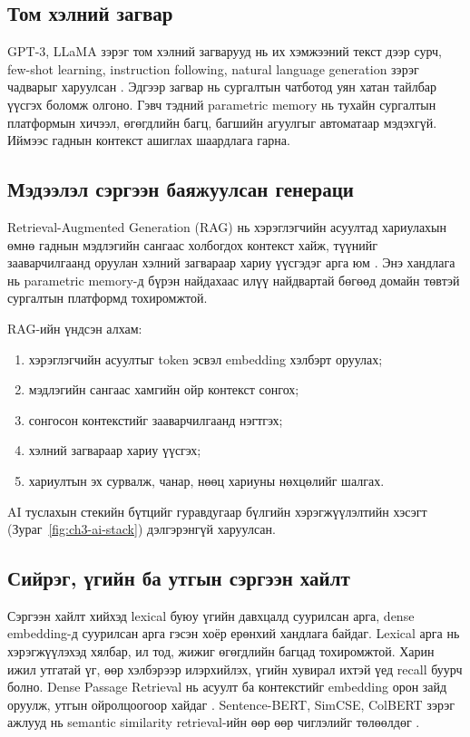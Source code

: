 \subsection{Том хэлний загвар}
GPT-3, LLaMA зэрэг том хэлний загварууд нь их хэмжээний текст дээр сурч, few-shot learning, instruction following, natural language generation зэрэг чадварыг харуулсан \cite{gpt3_brown_2020,llama_touvron_2023}. Эдгээр загвар нь сургалтын чатботод уян хатан тайлбар үүсгэх боломж олгоно. Гэвч тэдний parametric memory нь тухайн сургалтын платформын хичээл, өгөгдлийн багц, багшийн агуулгыг автоматаар мэдэхгүй. Иймээс гаднын контекст ашиглах шаардлага гарна.

\subsection{Мэдээлэл сэргээн баяжуулсан генераци}
Retrieval-Augmented Generation (RAG) нь хэрэглэгчийн асуултад хариулахын өмнө гаднын мэдлэгийн сангаас холбогдох контекст хайж, түүнийг зааварчилгаанд оруулан хэлний загвараар хариу үүсгэдэг арга юм \cite{rag_lewis_2020}. Энэ хандлага нь parametric memory-д бүрэн найдахаас илүү найдвартай бөгөөд домайн төвтэй сургалтын платформд тохиромжтой.

RAG-ийн үндсэн алхам:
\begin{enumerate}
  \item хэрэглэгчийн асуултыг token эсвэл embedding хэлбэрт оруулах;
  \item мэдлэгийн сангаас хамгийн ойр контекст сонгох;
  \item сонгосон контекстийг зааварчилгаанд нэгтгэх;
  \item хэлний загвараар хариу үүсгэх;
  \item хариултын эх сурвалж, чанар, нөөц хариуны нөхцөлийг шалгах.
\end{enumerate}

AI туслахын стекийн бүтцийг гуравдугаар бүлгийн хэрэгжүүлэлтийн хэсэгт (Зураг~\ref{fig:ch3-ai-stack}) дэлгэрэнгүй харуулсан.

\subsection{Сийрэг, үгийн ба утгын сэргээн хайлт}
Сэргээн хайлт хийхэд lexical буюу үгийн давхцалд суурилсан арга, dense embedding-д суурилсан арга гэсэн хоёр ерөнхий хандлага байдаг. Lexical арга нь хэрэгжүүлэхэд хялбар, ил тод, жижиг өгөгдлийн багцад тохиромжтой. Харин ижил утгатай үг, өөр хэлбэрээр илэрхийлэх, үгийн хувирал ихтэй үед recall буурч болно. Dense Passage Retrieval нь асуулт ба контекстийг embedding орон зайд оруулж, утгын ойролцоогоор хайдаг \cite{dpr_karpukhin_2020}. Sentence-BERT, SimCSE, ColBERT зэрэг ажлууд нь semantic similarity retrieval-ийн өөр өөр чиглэлийг төлөөлдөг \cite{sbert_reimers_2019,simcse_gao_2022,colbert_khattab_2020}.

